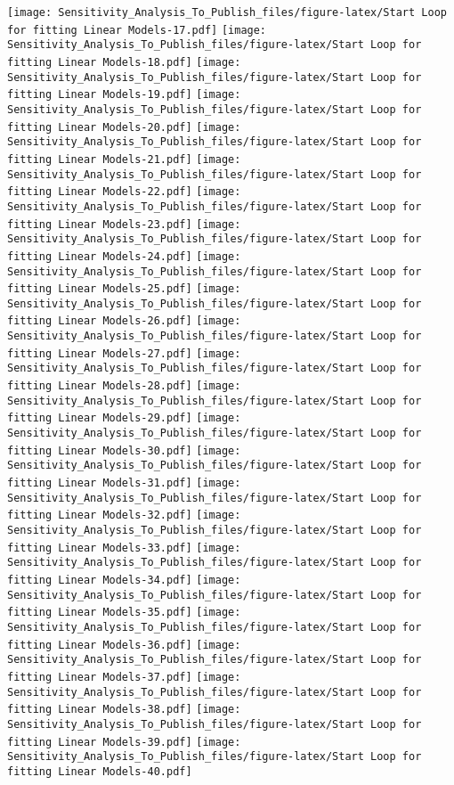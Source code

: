 \documentclass[
]{article}
\begin{document}
\texttt{[image: Sensitivity\_Analysis\_To\_Publish\_files/figure-latex/Start Loop for fitting Linear Models-17.pdf]}
\texttt{[image: Sensitivity\_Analysis\_To\_Publish\_files/figure-latex/Start Loop for fitting Linear Models-18.pdf]}
\texttt{[image: Sensitivity\_Analysis\_To\_Publish\_files/figure-latex/Start Loop for fitting Linear Models-19.pdf]}
\texttt{[image: Sensitivity\_Analysis\_To\_Publish\_files/figure-latex/Start Loop for fitting Linear Models-20.pdf]}
\texttt{[image: Sensitivity\_Analysis\_To\_Publish\_files/figure-latex/Start Loop for fitting Linear Models-21.pdf]}
\texttt{[image: Sensitivity\_Analysis\_To\_Publish\_files/figure-latex/Start Loop for fitting Linear Models-22.pdf]}
\texttt{[image: Sensitivity\_Analysis\_To\_Publish\_files/figure-latex/Start Loop for fitting Linear Models-23.pdf]}
\texttt{[image: Sensitivity\_Analysis\_To\_Publish\_files/figure-latex/Start Loop for fitting Linear Models-24.pdf]}
\texttt{[image: Sensitivity\_Analysis\_To\_Publish\_files/figure-latex/Start Loop for fitting Linear Models-25.pdf]}
\texttt{[image: Sensitivity\_Analysis\_To\_Publish\_files/figure-latex/Start Loop for fitting Linear Models-26.pdf]}
\texttt{[image: Sensitivity\_Analysis\_To\_Publish\_files/figure-latex/Start Loop for fitting Linear Models-27.pdf]}
\texttt{[image: Sensitivity\_Analysis\_To\_Publish\_files/figure-latex/Start Loop for fitting Linear Models-28.pdf]}
\texttt{[image: Sensitivity\_Analysis\_To\_Publish\_files/figure-latex/Start Loop for fitting Linear Models-29.pdf]}
\texttt{[image: Sensitivity\_Analysis\_To\_Publish\_files/figure-latex/Start Loop for fitting Linear Models-30.pdf]}
\texttt{[image: Sensitivity\_Analysis\_To\_Publish\_files/figure-latex/Start Loop for fitting Linear Models-31.pdf]}
\texttt{[image: Sensitivity\_Analysis\_To\_Publish\_files/figure-latex/Start Loop for fitting Linear Models-32.pdf]}
\texttt{[image: Sensitivity\_Analysis\_To\_Publish\_files/figure-latex/Start Loop for fitting Linear Models-33.pdf]}
\texttt{[image: Sensitivity\_Analysis\_To\_Publish\_files/figure-latex/Start Loop for fitting Linear Models-34.pdf]}
\texttt{[image: Sensitivity\_Analysis\_To\_Publish\_files/figure-latex/Start Loop for fitting Linear Models-35.pdf]}
\texttt{[image: Sensitivity\_Analysis\_To\_Publish\_files/figure-latex/Start Loop for fitting Linear Models-36.pdf]}
\texttt{[image: Sensitivity\_Analysis\_To\_Publish\_files/figure-latex/Start Loop for fitting Linear Models-37.pdf]}
\texttt{[image: Sensitivity\_Analysis\_To\_Publish\_files/figure-latex/Start Loop for fitting Linear Models-38.pdf]}
\texttt{[image: Sensitivity\_Analysis\_To\_Publish\_files/figure-latex/Start Loop for fitting Linear Models-39.pdf]}
\texttt{[image: Sensitivity\_Analysis\_To\_Publish\_files/figure-latex/Start Loop for fitting Linear Models-40.pdf]}
\end{document}
